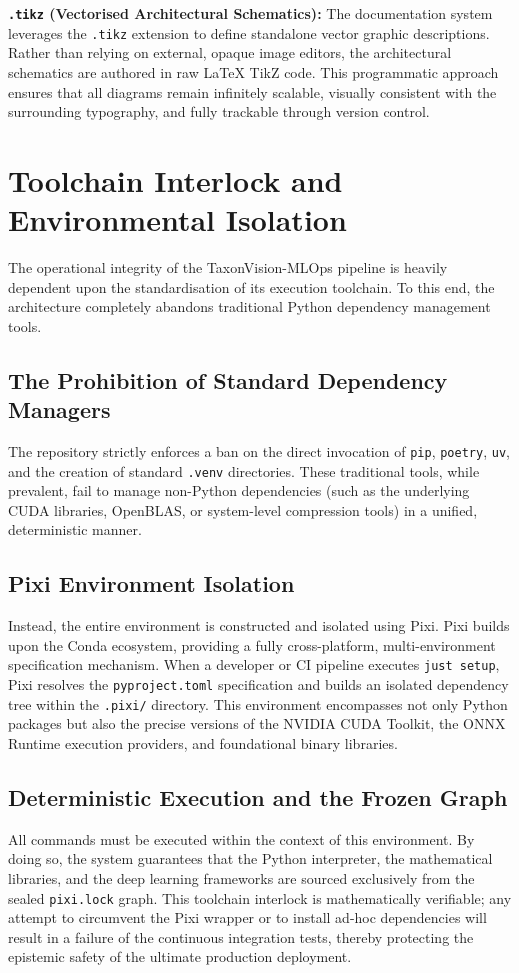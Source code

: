 \textbf{\texttt{.tikz} (Vectorised Architectural Schematics):} The documentation system leverages the \texttt{.tikz} extension to define standalone vector graphic descriptions. Rather than relying on external, opaque image editors, the architectural schematics are authored in raw LaTeX TikZ code. This programmatic approach ensures that all diagrams remain infinitely scalable, visually consistent with the surrounding typography, and fully trackable through version control.

\section{Toolchain Interlock and Environmental Isolation}
\label{sec:toolchain_interlock}

The operational integrity of the TaxonVision-MLOps pipeline is heavily dependent upon the standardisation of its execution toolchain. To this end, the architecture completely abandons traditional Python dependency management tools.

\subsection{The Prohibition of Standard Dependency Managers}
The repository strictly enforces a ban on the direct invocation of \texttt{pip}, \texttt{poetry}, \texttt{uv}, and the creation of standard \texttt{.venv} directories. These traditional tools, while prevalent, fail to manage non-Python dependencies (such as the underlying CUDA libraries, OpenBLAS, or system-level compression tools) in a unified, deterministic manner.

\subsection{Pixi Environment Isolation}
Instead, the entire environment is constructed and isolated using Pixi. Pixi builds upon the Conda ecosystem, providing a fully cross-platform, multi-environment specification mechanism. When a developer or CI pipeline executes \texttt{just setup}, Pixi resolves the \texttt{pyproject.toml} specification and builds an isolated dependency tree within the \texttt{.pixi/} directory. This environment encompasses not only Python packages but also the precise versions of the NVIDIA CUDA Toolkit, the ONNX Runtime execution providers, and foundational binary libraries.

\subsection{Deterministic Execution and the Frozen Graph}
All commands must be executed within the context of this environment. By doing so, the system guarantees that the Python interpreter, the mathematical libraries, and the deep learning frameworks are sourced exclusively from the sealed \texttt{pixi.lock} graph. This toolchain interlock is mathematically verifiable; any attempt to circumvent the Pixi wrapper or to install ad-hoc dependencies will result in a failure of the continuous integration tests, thereby protecting the epistemic safety of the ultimate production deployment.

